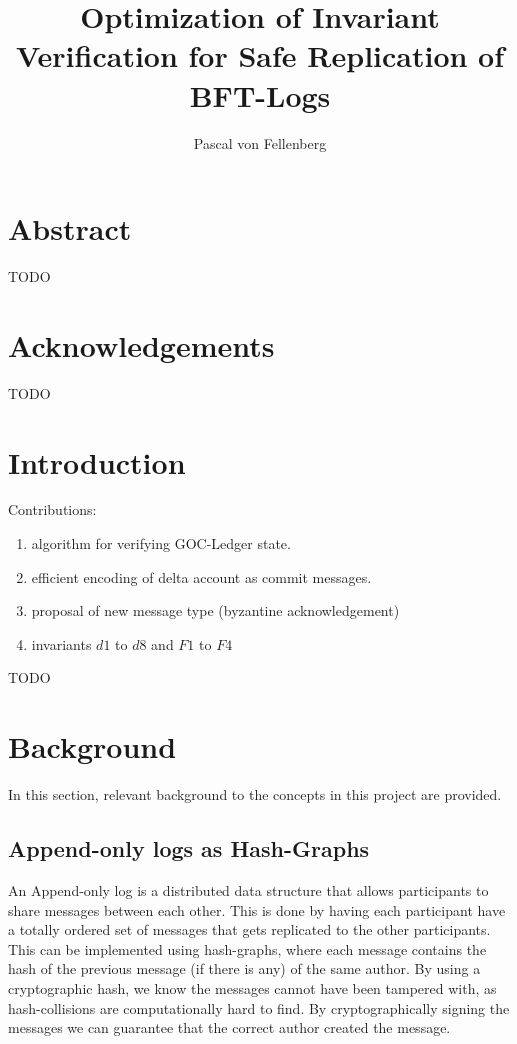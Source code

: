 \documentclass{article}
\title{Optimization of Invariant Verification for Safe Replication of BFT-Logs}
\author{Pascal von Fellenberg}
\begin{document}
\maketitle
\newcommand{\balance}[0]{\textsc{Balance}}
\newcommand{\apply}[0]{\textit{apply}}
\newcommand{\acc}[0]{\textit{acc}}
\newcommand{\msgId}[0]{\texttt{MsgId}}
\newcommand{\deltacc}[1]{#1^\delta}
\newcommand{\var}[1]{\textsl{#1}}
\newcommand{\msgType}[0]{\texttt{MsgType}}
\newcommand{\forkproof}[0]{\var{forkProof}}
\newcommand{\definedas}[0]{\stackrel{def}{=}}
\setlength{\marginparwidth}{100pt}

\section*{Abstract}
TODO
\section*{Acknowledgements}
TODO

\tableofcontents

\section{Introduction}
Contributions:
\begin{enumerate}
    \item algorithm for verifying GOC-Ledger state.
    \item efficient encoding of delta account as commit messages.
    \item proposal of new message type (byzantine acknowledgement)
    \item invariants $d1$ to $d8$ and $F1$ to $F4$
\end{enumerate}
TODO

\section{Background}
In this section, relevant background to the concepts in this project are provided. \\

\subsection{Append-only logs as Hash-Graphs}
An Append-only log is a distributed data structure that allows participants to share messages between each other. This is done by having each participant have a totally ordered set of messages that gets replicated to the other participants. This can be implemented using hash-graphs, where each message contains the hash of the previous message (if there is any) of the same author. By using a cryptographic hash, we know the messages cannot have been tampered with, as hash-collisions are computationally hard to find. By cryptographically signing the messages we can guarantee that the correct author created the message.
\end{document}

